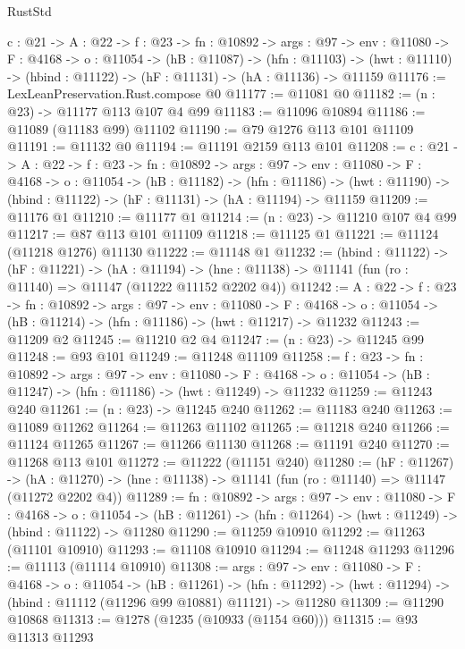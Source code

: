 \begin{lexlean}{RustStd}
\begin{coremodule}
  {c : @21} ->
  {A : @22} ->
  {f : @23} ->
  {fn : @10892} ->
  {args : @97} ->
  {env : @11080} ->
  {F : @4168} ->
  {o : @11054} ->
  (hB : @11087) ->
  (hfn : @11103) -> (hwt : @11110) -> (hbind : @11122) -> (hF : @11131) -> (hA : @11136) -> @11159
@11176 := LexLeanPreservation.Rust.compose @0
@11177 := @11081 @0
@11182 := (n : @23) -> @11177 @113 @107 @4 @99
@11183 := @11096 @10894
@11186 := @11089 (@11183 @99) @11102
@11190 := @79 @1276 @113 @101 @11109
@11191 := @11132 @0
@11194 := @11191 @2159 @113 @101
@11208 := {c : @21} ->
  {A : @22} ->
  {f : @23} ->
  {fn : @10892} ->
  {args : @97} ->
  {env : @11080} ->
  {F : @4168} ->
  {o : @11054} ->
  (hB : @11182) ->
  (hfn : @11186) -> (hwt : @11190) -> (hbind : @11122) -> (hF : @11131) -> (hA : @11194) -> @11159
@11209 := @11176 @1
@11210 := @11177 @1
@11214 := (n : @23) -> @11210 @107 @4 @99
@11217 := @87 @113 @101 @11109
@11218 := @11125 @1
@11221 := @11124 (@11218 @1276) @11130
@11222 := @11148 @1
@11232 := (hbind : @11122) ->
  (hF : @11221) ->
  (hA : @11194) -> (hne : @11138) -> @11141 (fun (ro : @11140) => @11147 (@11222 @11152 @2202 @4))
@11242 := {A : @22} ->
  {f : @23} ->
  {fn : @10892} ->
  {args : @97} ->
  {env : @11080} ->
  {F : @4168} -> {o : @11054} -> (hB : @11214) -> (hfn : @11186) -> (hwt : @11217) -> @11232
@11243 := @11209 @2
@11245 := @11210 @2 @4
@11247 := (n : @23) -> @11245 @99
@11248 := @93 @101
@11249 := @11248 @11109
@11258 := {f : @23} ->
  {fn : @10892} ->
  {args : @97} ->
  {env : @11080} ->
  {F : @4168} -> {o : @11054} -> (hB : @11247) -> (hfn : @11186) -> (hwt : @11249) -> @11232
@11259 := @11243 @240
@11261 := (n : @23) -> @11245 @240
@11262 := @11183 @240
@11263 := @11089 @11262
@11264 := @11263 @11102
@11265 := @11218 @240
@11266 := @11124 @11265
@11267 := @11266 @11130
@11268 := @11191 @240
@11270 := @11268 @113 @101
@11272 := @11222 (@11151 @240)
@11280 := (hF : @11267) ->
  (hA : @11270) -> (hne : @11138) -> @11141 (fun (ro : @11140) => @11147 (@11272 @2202 @4))
@11289 := {fn : @10892} ->
  {args : @97} ->
  {env : @11080} ->
  {F : @4168} ->
  {o : @11054} -> (hB : @11261) -> (hfn : @11264) -> (hwt : @11249) -> (hbind : @11122) -> @11280
@11290 := @11259 @10910
@11292 := @11263 (@11101 @10910)
@11293 := @11108 @10910
@11294 := @11248 @11293
@11296 := @11113 (@11114 @10910)
@11308 := {args : @97} ->
  {env : @11080} ->
  {F : @4168} ->
  {o : @11054} ->
  (hB : @11261) ->
  (hfn : @11292) -> (hwt : @11294) -> (hbind : @11112 (@11296 @99 @10881) @11121) -> @11280
@11309 := @11290 @10868
@11313 := @1278 (@1235 (@10933 (@1154 @60)))
@11315 := @93 @11313 @11293

\end{coremodule}
\end{lexlean}
